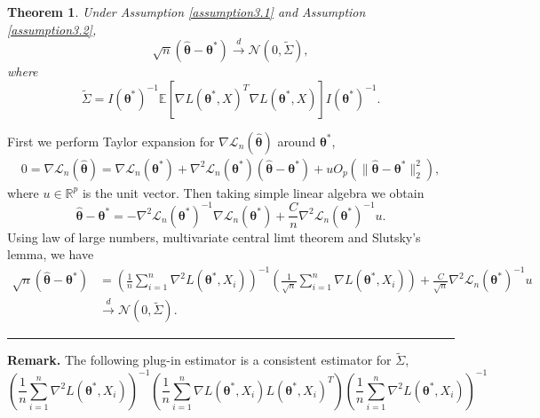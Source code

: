 \documentclass[12pt]{article}
\numberwithin{equation}{section}
\newtheorem{theorem}{Theorem}[section]
\newenvironment{proof}{{\bf Proof:}}{\hfill\rule{2mm}{2mm}}
\begin{document}
\begin{theorem}
	Under Assumption \ref{assumption3.1} and Assumption \ref{assumption3.2},
	\begin{equation}
	\sqrt{n}\left(\widehat{\boldsymbol{\theta}}-\boldsymbol{\theta}^{*}\right)\stackrel{d}{\longrightarrow}\mathcal{N}\left(0,\widetilde{\Sigma}\right),
	\end{equation}
	where 
	$$
	\widetilde{\Sigma}=I(\boldsymbol{\theta}^{*})^{-1}\mathbb{E}\left[\nabla L(\boldsymbol{\theta}^{*},X)^{T}\nabla L(\boldsymbol{\theta}^{*},X)\right]I(\boldsymbol{\theta}^{*})^{-1}.
	$$
\end{theorem}
\begin{proof}
	First we perform Taylor expansion for $\nabla\mathcal{L}_n(\widehat{\boldsymbol{\theta}})$ around $\boldsymbol{\theta}^{*}$,
	\begin{align*}
	0=\nabla \mathcal{L}_n(\widehat{\boldsymbol{\theta}})=\nabla\mathcal{L}_n(\boldsymbol{\theta}^{*})+\nabla^2\mathcal{L}_n(\boldsymbol{\theta}^{*})\left(\widehat{\boldsymbol{\theta}}-\boldsymbol{\theta}^{*}\right)+uO_p(\|\widehat{\boldsymbol{\theta}}-\boldsymbol{\theta}^{*}\|_2^2),
	\end{align*}
	where $u\in \mathbb{R}^p$ is the unit vector. Then taking simple linear algebra we obtain
	$$
	\widehat{\boldsymbol{\theta}}-\boldsymbol{\theta}^{*}=-\nabla^2\mathcal{L}_n(\boldsymbol{\theta}^{*})^{-1}\nabla\mathcal{L}_n(\boldsymbol{\theta}^{*})+\frac{C}{n}\nabla^2\mathcal{L}_n(\boldsymbol{\theta}^{*})^{-1}u.
	$$
	Using law of large numbers, multivariate central limt theorem and Slutsky's lemma, we have
	\begin{align*}
	\sqrt{n}\left(\widehat{\boldsymbol{\theta}}-\boldsymbol{\theta}^{*}\right)&=\left(\frac{1}{n}\sum_{i=1}^n\nabla^2 L(\boldsymbol{\theta}^{*},X_i)\right)^{-1}\left(\frac{1}{\sqrt{n}}\sum_{i=1}^n\nabla L(\boldsymbol{\theta}^{*},X_i)\right)+\frac{C}{\sqrt{n}}\nabla^2\mathcal{L}_n(\boldsymbol{\theta}^{*})^{-1}u\\
	&\stackrel{d}{\longrightarrow}\mathcal{N}\left(0,\widetilde{\Sigma}\right).
	\end{align*}
\end{proof}\newline
\textbf{Remark.} The following plug-in estimator is a consistent estimator for $\widetilde{\Sigma}$,
\begin{equation}
\left(\frac{1}{n}\sum_{i=1}^n\nabla^2 L(\boldsymbol{\theta}^{*},X_i)\right)^{-1}\left(\frac{1}{n}\sum_{i=1}^n\nabla L(\boldsymbol{\theta}^{*},X_i)L(\boldsymbol{\theta}^{*},X_i)^T\right)\left(\frac{1}{n}\sum_{i=1}^n\nabla^2 L(\boldsymbol{\theta}^{*},X_i)\right)^{-1}
\end{equation}
\end{document}
